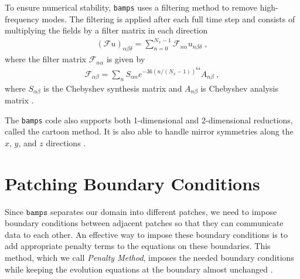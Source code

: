 To ensure numerical stability, \texttt{bamps} uses a filtering method to remove high-frequency modes. The filtering is applied after each full time step and consists of multiplying the fields by a filter matrix in each direction
%
\begin{align}
 (\mathcal{F}u)_{\alpha \beta \delta} = \sum_{n=0}^{N_x -1} \mathcal{F}_{n \alpha} u_{n \beta \delta} \; ,
\end{align}
%
where the filter matrix $\mathcal{F}_{n \alpha}$ is given by
%
\begin{align}
    \mathcal{F}_{\alpha \beta} = \sum_n S_{\alpha n} e^{-36 (n/(N_x - 1))^{64}} A_{n \beta} \; ,
\end{align}
%
where $S_{\alpha \beta}$ is the Chebyshev synthesis matrix and $A_{n \beta}$ is Chebyshev analysis matrix \cite{Pseudospectral_method_for_gravitational_wave_collapse,Numerical_Relativity_Solving_Einsteins_Equations_on_the_Computer}.

The \texttt{bamps} code also supports both 1-dimensional and 2-dimensional reductions, called the cartoon method. It is also able to handle mirror symmetries along the $x$, $y$, and $z$ directions \cite{The_evolution_of_hyperboloidal_data_with_the_dual_foliation_formalism_Mathematical_analysis_and_wave_equation_tests}.

\section{Patching Boundary Conditions}
\label{section:Patch_Boundaries}

Since $\texttt{bamps}$ separates our domain into different patches, we need to impose boundary conditions between adjacent patches so that they can communicate data to each other. An effective way to impose these boundary conditions is to add appropriate penalty terms to the equations on these boundaries. This method, which we call \textit{Penalty Method}, imposes the needed boundary conditions while keeping the evolution equations at the boundary almost unchanged \cite{Pseudospectral_method_for_gravitational_wave_collapse,Spectral_methods_for_the_wave_equation_in_second-order_form}.

